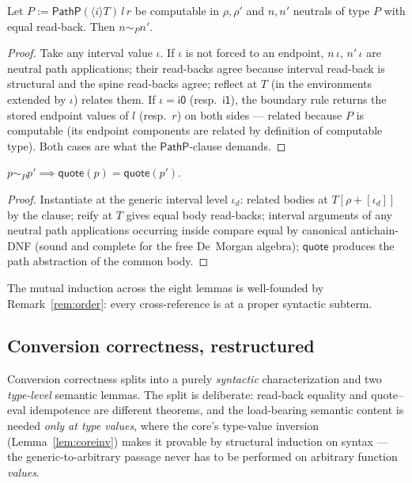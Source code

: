 \documentclass{lmcs}
\newcommand{\ii}{\mathsf{i1}}
\newcommand{\io}{\mathsf{i0}}
\newcommand{\quo}{\mathsf{quote}}
\begin{document}
\begin{lem}\label{lem:reflPath}
  Let $P := \mathsf{PathP}(\langle i \rangle T)\,l\,r$ be
  computable in $\rho, \rho'$ and $n, n'$ neutrals of type $P$ with
  equal read-back.  Then $n \sim_P n'$.
\end{lem}
\begin{proof}
  Take any interval value $\iota$.  If $\iota$ is not forced to an
  endpoint, $n\,\iota$, $n'\,\iota$ are neutral path applications;
  their read-backs agree because interval read-back is structural
  and the spine read-backs agree; reflect at $T$ (in the
  environments extended by $\iota$) relates them.  If
  $\iota = \io$ (resp.\ $\ii$), the boundary rule returns the
  stored endpoint values of $l$ (resp.\ $r$) on both sides ---
  related because $P$ is computable (its endpoint components are
  related by definition of computable type).  Both cases are what
  the $\mathsf{PathP}$-clause demands.
\end{proof}

\begin{lem}\label{lem:reifPath}
  $p \sim_P p' \implies \quo(p) = \quo(p')$.
\end{lem}
\begin{proof}
  Instantiate at the generic interval level $\iota_d$: related
  bodies at $T[\rho{+}[\iota_d]]$ by the clause; reify at $T$
  gives equal body read-backs; interval arguments of any neutral
  path applications occurring inside compare equal by canonical
  antichain-DNF (sound and complete for the free De~Morgan
  algebra); $\quo$ produces the path abstraction of the common
  body.
\end{proof}

\noindent The mutual induction across the eight lemmas is
well-founded by Remark~\ref{rem:order}: every cross-reference is at
a proper syntactic subterm.

\subsection{Conversion correctness, restructured}
\label{app:coreconv}

Conversion correctness splits into a purely \emph{syntactic}
characterization and two \emph{type-level} semantic lemmas.  The
split is deliberate: read-back equality and quote--eval idempotence
are different theorems, and the load-bearing semantic content is
needed \emph{only at type values}, where the core's type-value
inversion (Lemma~\ref{lem:coreinv}) makes it provable by structural
induction on syntax --- the generic-to-arbitrary passage never has
to be performed on arbitrary function \emph{values}.
\end{document}
